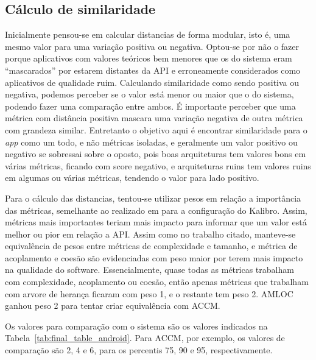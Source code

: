 \subsection{Cálculo de similaridade}

Inicialmente pensou-se em calcular distancias de forma modular, isto é, uma mesmo valor para uma variação positiva ou negativa. Optou-se por não o fazer porque aplicativos com valores teóricos bem menores que os do sistema eram ``mascarados'' por estarem distantes da API e erroneamente considerados como aplicativos de qualidade ruim.  Calculando similaridade como sendo positiva ou negativa, podemos perceber se o valor está menor ou maior que o do sistema, podendo fazer uma comparação entre ambos. É importante perceber que uma métrica com distância positiva mascara uma variação negativa de outra métrica com grandeza similar. Entretanto o objetivo aqui é encontrar similaridade para o \textit{app} como um todo, e não métricas isoladas, e geralmente um valor positivo ou negativo se sobressai sobre o oposto, pois boas arquiteturas tem valores bons em várias métricas, ficando com score negativo, e arquiteturas ruins tem valores ruins em algumas ou várias métricas, tendendo o valor para lado positivo. 


Para o cálculo das distancias, tentou-se utilizar pesos em relação a importância das métricas, semelhante ao realizado em  para a configuração do Kalibro. Assim, métricas mais importantes teriam mais impacto para informar que um valor está melhor ou pior em relação a API. Assim como no trabalho citado, manteve-se equivalência de pesos entre métricas de complexidade e tamanho, e métrica de acoplamento e coesão são evidenciadas com peso maior por terem mais impacto na qualidade do software. Essencialmente, quase todas as métricas trabalham com complexidade, acoplamento ou coesão, então apenas métricas que trabalham com arvore de herança ficaram com peso 1, e o restante tem peso 2. AMLOC ganhou peso 2 para tentar criar equivalência com ACCM.

Os valores para comparação com o sistema são os valores indicados na Tabela~\ref{tab:final_table_android}. Para ACCM, por exemplo, os valores de comparação são 2, 4 e 6, para os percentis 75, 90 e 95, respectivamente. 

